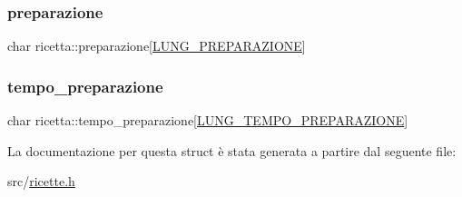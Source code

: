 \mbox{\label{structricetta_a8c769fcee937b4b060b796a2ae2c1086}} 
\subsubsection{\texorpdfstring{preparazione}{preparazione}}
{\footnotesize\ttfamily char ricetta\+::preparazione\mbox{[}\hyperlink{ricette_8h_abdbfa8d79884434777eae730867d54cd}{L\+U\+N\+G\+\_\+\+P\+R\+E\+P\+A\+R\+A\+Z\+I\+O\+NE}\mbox{]}}

\mbox{\label{structricetta_aa7c5427cccd26a39a8c7a34050eea6be}} 
\subsubsection{\texorpdfstring{tempo\+\_\+preparazione}{tempo\_preparazione}}
{\footnotesize\ttfamily char ricetta\+::tempo\+\_\+preparazione\mbox{[}\hyperlink{ricette_8h_a711f3911a37877bbfa09796364e391ab}{L\+U\+N\+G\+\_\+\+T\+E\+M\+P\+O\+\_\+\+P\+R\+E\+P\+A\+R\+A\+Z\+I\+O\+NE}\mbox{]}}



La documentazione per questa struct è stata generata a partire dal seguente file\+:\begin{DoxyCompactItemize}
\item 
src/\hyperlink{ricette_8h}{ricette.\+h}\end{DoxyCompactItemize}
